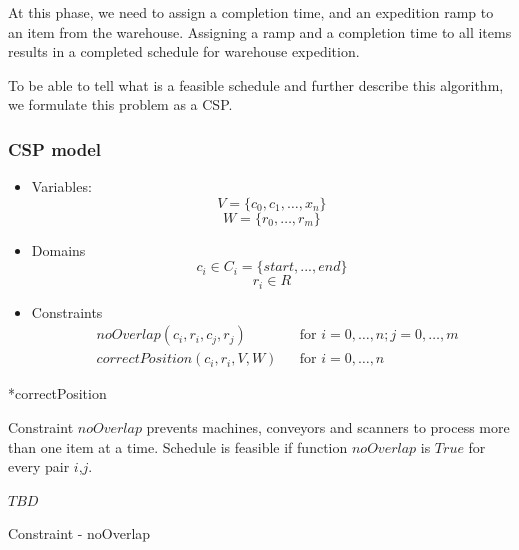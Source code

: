 \documentclass{ctuthesis}
\begin{document}
At this phase, we need to assign a completion time, and an expedition ramp to an item from the warehouse. Assigning a ramp and a completion time to all items results in a completed schedule for warehouse expedition. 

To be able to tell what is a feasible schedule and further describe this algorithm, we formulate this problem as a CSP. 

\subsubsection{CSP model}

\begin{itemize}
    \item Variables:\\
    \begin{equation}
        V = \{c_{0}, c_{1}, \ldots, x_{n}\}
    \end{equation}
    \begin{equation}
        W = \{r_0, \ldots, r_m\}
    \end{equation}
    \item Domains\\
    \begin{equation}
    c_{i} \in C_i = \{start, ..., end\}
    \end{equation}
    \begin{equation}
    r_{i} \in R
    \end{equation}
    \item Constraints
    \begin{equation}
    \begin{aligned}
    & noOverlap(c_i, r_i, c_j, r_j) &&\text{for } i=0,\ldots,n; j=0,\ldots,m\\
    & correctPosition(c_i, r_i, V, W) && \text{for } i=0,\ldots,n
    \end{aligned}
    \end{equation}
\end{itemize}

*correctPosition

Constraint $noOverlap$ prevents machines, conveyors and scanners to process more than one item at a time. Schedule is feasible if function $noOverlap$ is $True$ for every pair $i$,$j$.
\label{overlap}
\begin{algorithm}
\SetAlgoLined
{}
$TBD$
 \caption{Constraint - noOverlap}
\end{algorithm}
\end{document}
